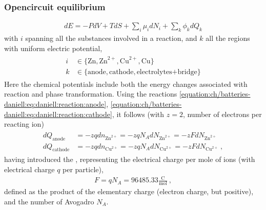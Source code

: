 \documentclass[letterpaper,10pt,english]{jupyterBook}
\begin{document}
\subsubsection{Open\sphinxhyphen{}circuit equilibrium}
\label{\detokenize{ch/batteries-daniell:open-circuit-equilibrium}}\label{\detokenize{ch/batteries-daniell:electro-chemical-batteries-daniell-regimes-open}}
\sphinxAtStartPar
{}
\begin{equation*}
\begin{split}dE = - P dV + T dS + \sum_i \mu_i d N_i + \sum_k \phi_k d Q_k\end{split}
\end{equation*}
\sphinxAtStartPar
with \(i\) spanning all the substances involved in a reaction, and \(k\) all the regions with uniform electric potential,
\begin{equation*}
\begin{split}\begin{aligned}
  i & \in \{ \text{Zn}, \text{Zn}^{2+}, \text{Cu}^{2+}, \text{Cu} \} \\
  k & \in \{ \text{anode}, \text{cathode}, \text{electrolytes+bridge} \}
\end{aligned}\end{split}
\end{equation*}
\sphinxAtStartPar
Here the chemical potentials include both the energy changes associated with reaction and phase transformation.
Using the reactions \eqref{equation:ch/batteries-daniell:eq:daniell:reaction:anode}, \eqref{equation:ch/batteries-daniell:eq:daniell:reaction:cathode}, it follows (with \(z = 2\), number of electrons per reacting ion)
\begin{equation*}
\begin{split}\begin{aligned}
  d Q_{\text{anode}}   & = - z q d n_{\text{Zn}^{2+}} =  - z q N_{A} d N_{\text{Zn}^{2+}} = - z F d N_{\text{Zn}^{2+}} \\ 
  d Q_{\text{cathode}} & = - z q d n_{\text{Cu}^{2+}} =  - z q N_{A} d N_{\text{Cu}^{2+}} = - z F d N_{\text{Cu}^{2+}} \ , 
\end{aligned}\end{split}
\end{equation*}
\sphinxAtStartPar
having introduced the , representing the electrical charge per mole of ions (with electrical charge \(q\) per particle),
\begin{equation*}
\begin{split}F = q N_A = 96 485.33 \frac{\text{C}}{\text{mol}} \ ,\end{split}
\end{equation*}
\sphinxAtStartPar
defined as the product of the elementary charge (electron charge, but positive), and the number of Avogadro \(N_A\).
\end{document}

